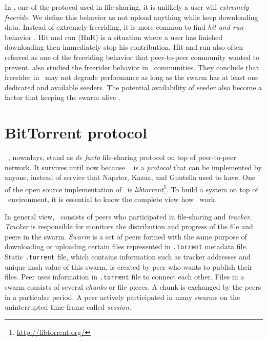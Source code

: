 In \bt, one of the protocol used in file-sharing, it is unlikely a user will \textit{extremely freeride}. We define this behavior as not upload anything while keep downloading data. Instead of extremely freeriding, it is more common to find \textit{hit and run} behavior \cite{2011:managesupplydemand:meulpolder}. Hit and run (HnR) is a situation where a user has finished downloading then immediately stop his contribution. Hit and run also often referred as one of the freeriding behavior that peer-to-peer community wanted to prevent. \citeauthor{2015:freeriderinbtcommunity:das} also studied the freerider behavior in \bt~communities. They conclude that freerider in \bt~may not degrade performance as long as the swarm has at least one dedicated and available seeders. The potential availability of seeder also become a factor that keeping the swarm alive \cite{2015:freeriderinbtcommunity:das}. 

\section{BitTorrent protocol}
\bt~\cite{2003:bittorrent:cohen}, nowadays, stand as \textit{de facto} file-sharing protocol on top of peer-to-peer network. It survives until now because \bt~ is a \textit{protocol} that can be implemented by anyone, instead of service that Napster, Kazaa, and Gnutella used to have. One of the open source implementation of \bt~is \textit{libtorrent}\footnote{\url{http://libtorrent.org/}}. To build a system on top of \bt~environment, it is essential to know the complete view how \bt~work. 

In general view, \bt~consists of peers who participated in file-sharing and \textit{tracker}. \textit{Tracker} is responsible for monitors the distribution and progress of the file and peers in the swarm. \textit{Swarm} is a set of peers formed with the same purpose of downloading or uploading certain files represented in \texttt{.torrent} metadata file. Static \texttt{.torrent} file, which contains information such as tracker addresses and unique hash value of this swarm, is created by peer who wants to publish their files. Peer uses information in \texttt{.torrent} file to connect each other. Files in a swarm consists of several \textit{chunks} or file pieces. A chunk is exchanged by the peers in a particular period. A peer actively participated in many swarms on the uninterrupted time-frame called \textit{session}.

